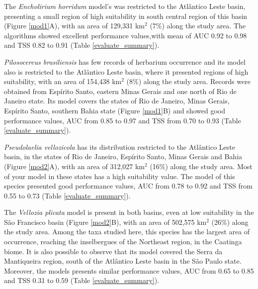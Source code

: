 
The \textit{Encholirium horridum}  model's  was restricted to the Atlântico Leste basin, presenting a small region of high suitability in south central region of this basin (Figure \ref{mod1}A), with an area of 129,331 km$^{2}$ (7\%) along the study area. The algorithms showed excellent performance values,with mean of AUC 0.92 to 0.98 and TSS 0.82 to 0.91 (Table \ref{evaluate_summary}). 

\textit{Pilosocereus brasiliensis} has few records of herbarium occurrence and its model also is restricted to the Atlântico Leste basin, where it presented regions of high suitability, with an area of 154,438 km$^{2}$ (8\%) along the study area. Records were obtained from Espírito Santo, eastern Minas Gerais and one north of Rio de Janeiro state. Its model covers the states of Rio de Janeiro, Minas Gerais, Espírito Santo, southern Bahia state (Figure \ref{mod1}B) and showed good performance values, AUC from 0.85 to 0.97 and TSS from 0.70 to 0.93 (Table \ref{evaluate_summary}).

\textit{Pseudolaelia vellozicola} has its distribution restricted to the Atlântico Leste basin, in the states of Rio de Janeiro, Espírito Santo, Minas Gerais and Bahia (Figure \ref{mod2}A), with an area of 312,027 km$^{2}$ (16\%) along the study area. Most of your model in these states has a high suitability value. The model of this species presented good performance values, AUC from 0.78 to 0.92 and TSS from 0.55 to 0.73 (Table \ref{evaluate_summary}). 

The \textit{Vellozia plicata} model is present in both basins, even at low suitability in the São Francisco basin (Figure \ref{mod2}B), with an area of 502,575 km$^{2}$ (26\%) along the study area. Among the taxa studied here, this species has the largest area of occurrence, reaching the inselbergues of the Northeast region, in the Caatinga biome. It is also possible to observe that its model covered the Serra da Mantiqueira region, south of the Atlântico Leste basin in the São Paulo state. Moreover, the models presents similar performance values, AUC from 0.65 to 0.85 and TSS 0.31 to 0.59 (Table \ref{evaluate_summary}).



